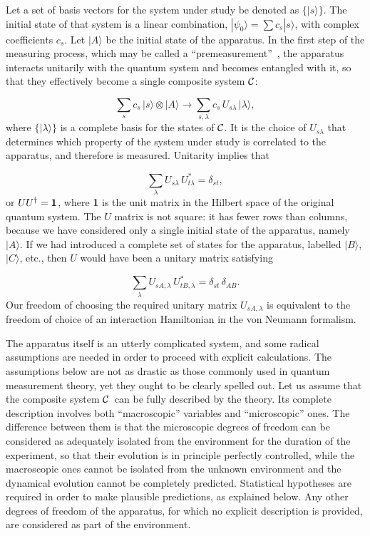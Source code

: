 \documentclass[12pt]{article}
\def\beq{\begin{equation}}
\def\eeq{\end{equation}}
\def\0{\otimes}
\def\9{\rangle}
\def\cC{$\cal C$}
\begin{document}
Let a set of basis vectors for the system under study be denoted as
$\{|s\9\}$. The initial state of that system is a linear combination,
$|\psi_0\9=\sum c_s|s\9$, with complex coefficients $c_s$. Let $|A\9$ be
the initial state of the apparatus. In the first step of the measuring
process, which may be called a ``premeasurement''~\cite{undo}, the
apparatus interacts unitarily with the quantum system and becomes
entangled with it, so that they effectively become a single composite
system \cC:

\beq \sum_s c_s\,|s\9\0|A\9\to
  \sum_{s,\lambda} c_s\,U_{s\lambda}\,|\lambda\9,\label{premea}\eeq
where $\{|\lambda\9\}$ is a complete basis for the states of \cC. It is
the choice of $U_{s\lambda}$ that determines which property of the
system under study is correlated to the apparatus, and therefore is
measured. Unitarity implies that

\beq \sum_\lambda U_{s\lambda}\, U_{t\lambda}^*=\delta_{st},
 \label{unitU}\eeq
or $UU^\dagger={\bf1}$, where {\bf1} is the unit matrix in the Hilbert
space of the original quantum system. The $U$ matrix is not square: it
has fewer rows than columns, because we have considered only a single
initial state of the apparatus, namely $|A\9$. If we had introduced a
complete set of states for the apparatus, labelled $|B\9$, $|C\9$, etc.,
then $U$ would have been a unitary matrix satisfying

\beq \sum_\lambda U_{sA,\lambda}\, U_{tB,\lambda}^*=
 \delta_{st}\,\delta_{AB}.\eeq
Our freedom of choosing the required unitary matrix $U_{sA,\lambda}$ is
equivalent to the freedom of choice of an interaction Hamiltonian in the
von Neumann formalism.

The apparatus itself is an utterly complicated system, and some radical
assumptions are needed in order to proceed with explicit calculations.
The assumptions below are not as drastic as those commonly used in
quantum measurement theory, yet they ought to be clearly spelled out.
Let us assume that the composite system \cC\ can be fully described by
the theory. Its complete description involves both ``macroscopic''
variables and ``microscopic'' ones. The difference between them is that
the microscopic degrees of freedom can be considered as adequately
isolated from the environment for the duration of the experiment, so
that their evolution is in principle perfectly controlled, while the
macroscopic ones cannot be isolated from the unknown environment and
the dynamical evolution cannot be completely predicted. Statistical
hypotheses are required in order to make plausible predictions, as
explained below. Any other degrees of freedom of the apparatus, for
which no explicit description is provided, are considered as part of the
environment.
\end{document}
